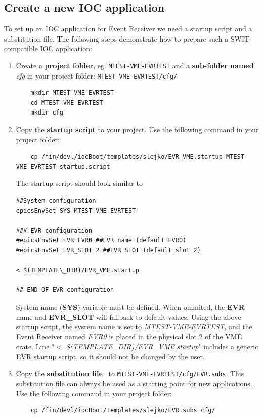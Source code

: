 \documentclass[12pt,a4paper]{article}
\begin{document}
\subsection{Create a new IOC application}
To set up an IOC application for Event Receiver we need a startup script and a substitution file. The following steps demonstrate how to prepare such a SWIT compatible IOC application:
\begin{enumerate}

	\item Create a \textbf{project folder}, eg. \texttt{MTEST-VME-EVRTEST} and a \textbf{sub-folder named} \textit{cfg} in your project folder: \texttt{MTEST-VME-EVRTEST/cfg/}
\begin{lstlisting}
	mkdir MTEST-VME-EVRTEST
	cd MTEST-VME-EVRTEST
	mkdir cfg
\end{lstlisting}

	\item Copy the \textbf{startup script} to your project. Use the following command in your project folder:
\begin{lstlisting}
	cp /fin/devl/iocBoot/templates/slejko/EVR_VME.startup MTEST-VME-EVRTEST_startup.script
\end{lstlisting}

	The startup script should look similar to 
\begin{lstlisting}
##System configuration
epicsEnvSet SYS MTEST-VME-EVRTEST

### EVR configuration
#epicsEnvSet EVR EVR0 ##EVR name (default EVR0)
#epicsEnvSet EVR_SLOT 2 ##EVR SLOT (default slot 2)

< $(TEMPLATE\_DIR)/EVR_VME.startup

## END OF EVR configuration
\end{lstlisting}

System name (\textbf{SYS}) variable must be defined. When ommited, the \textbf{EVR} name and \textbf{EVR\_SLOT} will fallback to default values. Using the above startup script, the system name is set to \textit{MTEST-VME-EVRTEST}, and the Event Receiver named \textit{EVR0} is placed in the physical slot 2 of the VME crate. Line "\textit{$<$ \$(TEMPLATE\_DIR)/EVR\_VME.startup}" includes a generic EVR startup script, so it should not be changed by the user.

	\item Copy the \textbf{substitution file}~\cite{substitution_git} to \texttt{MTEST-VME-EVRTEST/cfg/EVR.subs}. This substitution file can always be used as a starting point for new applications. Use the following command in your project folder: 
\begin{lstlisting}
	cp /fin/devl/iocBoot/templates/slejko/EVR.subs cfg/
\end{lstlisting}
\end{enumerate}
\end{document}
